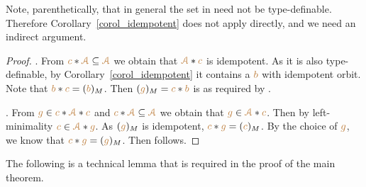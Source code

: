 Note, parenthetically, that in general the set in  need not be type-definable.
Therefore Corollary~\ref{corol_idempotent} does not apply directly, and we need an indirect argument.

\begin{proof}.  
From ${\color{brown} c}*{\color{brown}\EuScript A}\subseteq{\color{brown}\EuScript A}$ we obtain that ${\color{brown}\EuScript A}*{\color{brown} c}$ is idempotent.
As it is  also type-definable, by Corollary~\ref{corol_idempotent} it contains a ${\color{brown} b}$ with idempotent orbit.
Note that ${\color{brown} b}*{\color{brown} c}=({\color{brown} b})_M$.
Then $({\color{brown} g})_M={\color{brown} c}*{\color{brown} b}$ is as required by .

. From ${\color{brown} g}\in{\color{brown}c}*{\color{brown}\EuScript A}*{\color{brown} c}$ and ${\color{brown} c}*{\color{brown}\EuScript A}\subseteq{\color{brown}\EuScript A}$ we obtain that ${\color{brown} g}\in{\color{brown}\EuScript A}*{\color{brown} c}$.
Then by left-minimality ${\color{brown} c}\in{\color{brown}\EuScript A}*{\color{brown} g}$.
As $({\color{brown} g})_M$ is idempotent, ${\color{brown} c}*{\color{brown} g}=({\color{brown} c})_M$.
By the choice of ${\color{brown} g}$, we know that ${\color{brown} c}*{\color{brown} g}=({\color{brown} g})_M$.
Then  follows.
\end{proof}

The following is a technical lemma that is required in the proof of the main theorem.


